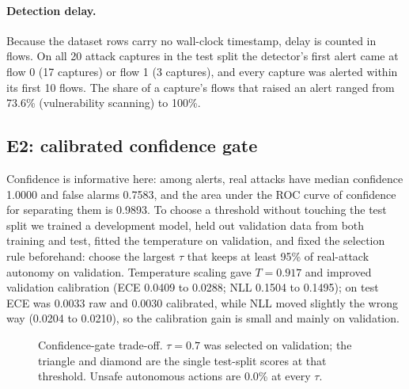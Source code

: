\documentclass[preprint,12pt]{elsarticle}
\begin{document}
\paragraph{Detection delay.}
Because the dataset rows carry no wall-clock timestamp, delay is counted in flows. On all 20 attack captures in the test split the detector's first alert came at flow 0 (17 captures) or flow 1 (3 captures), and every capture was alerted within its first 10 flows. The share of a capture's flows that raised an alert ranged from 73.6\% (vulnerability scanning) to 100\%.

\subsection{E2: calibrated confidence gate}
\label{sec:gate}
Confidence is informative here: among alerts, real attacks have median confidence 1.0000 and false alarms 0.7583, and the area under the ROC curve of confidence for separating them is 0.9893. To choose a threshold without touching the test split we trained a development model, held out validation data from both training and test, fitted the temperature on validation, and fixed the selection rule beforehand: choose the largest $\tau$ that keeps at least 95\% of real-attack autonomy on validation. Temperature scaling gave $T=0.917$ and improved validation calibration (ECE 0.0409 to 0.0288; NLL 0.1504 to 0.1495); on test ECE was 0.0033 raw and 0.0030 calibrated, while NLL moved slightly the wrong way (0.0204 to 0.0210), so the calibration gain is small and mainly on validation.

\begin{figure}[htbp]
\centering
{}
\caption{Confidence-gate trade-off. $\tau=0.7$ was selected on validation; the triangle and diamond are the single test-split scores at that threshold. Unsafe autonomous actions are 0.0\% at every $\tau$.}
\label{fig:gate}
\end{figure}
\end{document}
